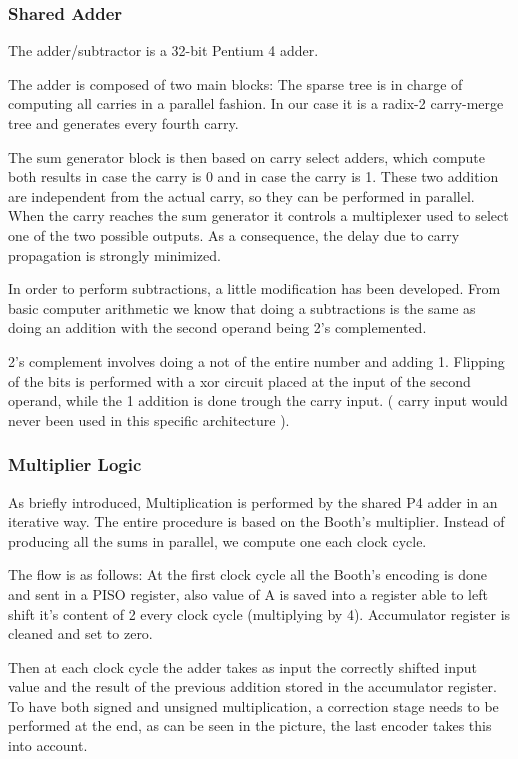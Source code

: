 \documentclass[12pt]{article}
\begin{document}
\subsubsection{Shared Adder}
The adder/subtractor is a 32-bit Pentium 4 adder.

The adder is composed of two main blocks: 
The sparse tree is in charge of computing all carries in a parallel fashion. In our case it is a radix-2 carry-merge tree and generates every fourth carry. 

The sum generator block is then based on carry select adders, which compute both results in case the carry is 0 and in case the carry is 1. These two addition are independent from the actual carry, so they can be performed in parallel. When the carry reaches the sum generator it controls a multiplexer used to select one of the two possible outputs.
As a consequence, the delay due to carry propagation is strongly minimized.

In order to perform subtractions, a little modification has been developed. From basic computer arithmetic we know that doing a subtractions is the same as doing an addition with the second operand being 2's complemented.

2's complement involves doing a not of the entire number and adding 1.
Flipping of the bits is performed with a xor circuit placed at the input of the second operand, while the 1 addition is done trough the carry input. ( carry input would never been used in this specific architecture ). 



\subsubsection{Multiplier Logic}
As briefly introduced, Multiplication is performed by the shared P4 adder in an iterative way.
The entire procedure is based on the Booth's multiplier. Instead of producing all the sums in parallel, we compute one each clock cycle.

The flow is as follows:
At the first clock cycle all the Booth's encoding is done and sent in a PISO register, also value of A is saved into a register able to left shift it's content of 2 every clock cycle (multiplying by 4). Accumulator register is cleaned and set to zero.

Then at each clock cycle the adder takes as input the correctly shifted input value and the result of the previous addition stored in the accumulator register.
To have both signed and unsigned multiplication, a correction stage needs to be performed at the end, as can be seen in the picture, the last encoder takes this into account.
\end{document}
